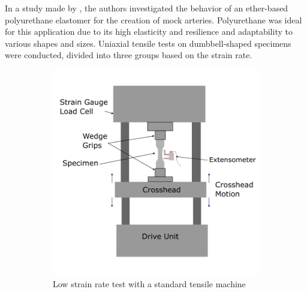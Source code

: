 In a study made by \citet{Kanyanta2010}, the authors investigated the behavior of an ether-based polyurethane 
elastomer for the creation of mock arteries. Polyurethane was ideal for this application due to 
its high elasticity and resilience and adaptability to various shapes and sizes. Uniaxial tensile tests on 
dumbbell-shaped specimens were conducted, divided into three groups based on the strain rate.

\begin{figure}
        \centering
    
        \begin{subfigure}[b]{0.45\textwidth}
        \centering
        \includegraphics[width=\textwidth]{Images/chapter1/uniaxialtension.png}
        \caption{Low strain rate test with a standard tensile machine}
        \label{fig:subfiglow}
        \end{subfigure}
        \hfill
        \begin{subfigure}[b]{0.45\textwidth}
        \centering

\end{subfigure}
\end{figure}
